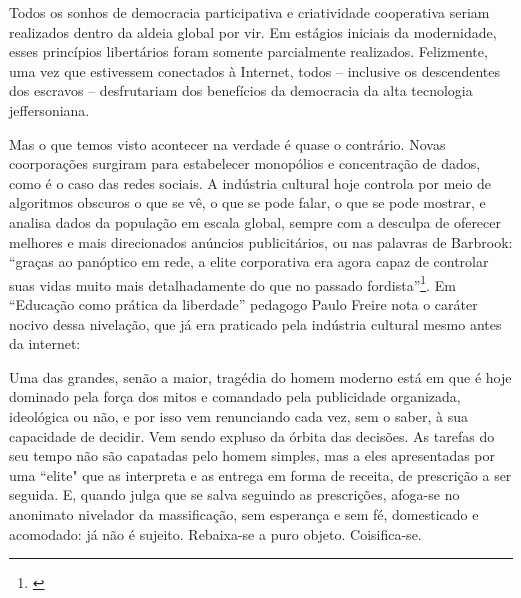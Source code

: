 \begin{citacao}
Todos os sonhos de democracia participativa e criatividade cooperativa seriam realizados dentro da aldeia global por vir. Em estágios iniciais da modernidade, esses princípios libertários foram somente parcialmente realizados. Felizmente, uma vez que estivessem conectados à Internet, todos – inclusive os descendentes dos escravos – desfrutariam dos benefícios da democracia da alta tecnologia jeffersoniana.
\end{citacao}\cite[365]{Barbrook2009}

Mas o que temos visto acontecer na verdade é quase o contrário. Novas coorporações surgiram para estabelecer monopólios e concentração de dados, como é o caso das redes sociais. A indústria cultural hoje controla por meio de algoritmos obscuros o que se vê, o que se pode falar, o que se pode mostrar, e analisa dados da população em escala global, sempre com a desculpa de oferecer melhores e mais direcionados anúncios publicitários, ou nas palavras de Barbrook: ``graças ao panóptico em rede, a elite corporativa era agora capaz de controlar suas vidas muito mais detalhadamente do que no passado fordista''\footnote{\cite[345]{Barbrook2009}}. Em ``Educação como prática da liberdade'' pedagogo Paulo Freire nota o caráter nocivo dessa nivelação, que já era praticado pela indústria cultural mesmo antes da internet:




\begin{citacao}
Uma das grandes, senão a maior, tragédia do homem moderno está em que é hoje dominado pela força dos mitos e comandado pela publicidade organizada, ideológica ou não, e por isso vem renunciando cada vez, sem o saber, à sua capacidade de decidir. Vem sendo expluso da órbita das decisões. As tarefas do seu tempo não são capatadas pelo homem simples, mas a eles apresentadas por uma ``elite" que as interpreta e as entrega em forma de receita, de prescrição a ser seguida. E, quando julga que se salva seguindo as prescrições, afoga-se no anonimato nivelador da massificação, sem esperança e sem fé, domesticado e acomodado: já não é sujeito. Rebaixa-se a puro objeto. Coisifica-se. \cite[60]{Freire2015}
\end{citacao} 


